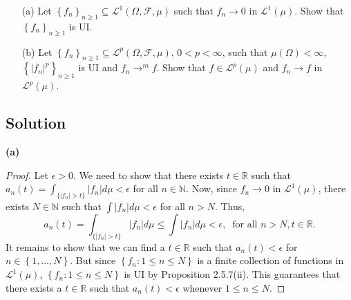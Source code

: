 \documentclass[12pt]{article}
\begin{document}
\begin{itemize}[label={}, leftmargin=7mm]
\item[(a)] Let $\left\{ f_{n} \right\}_{n\geq 1} \subseteq \mathcal{L}^{1}\left( \Omega, \mathcal{F}, \mu \right)$ such that $f_{n} \rightarrow 0$ in
$\mathcal{L}^{1}(\mu)$. Show that $\left\{ f_{n} \right\}_{n\geq 1}$ is UI.

\item[(b)] Let $\left\{ f_{n} \right\}_{n\geq 1} \subseteq \mathcal{L}^{p}\left( \Omega, \mathcal{F}, \mu \right)$, $0 < p < \infty$, such that
$\mu(\Omega) < \infty$, $\left\{ |f_{n}|^{p} \right\}_{n\geq 1}$ is UI and $f_{n} \rightarrow^{m} f$. Show that $f \in \mathcal{L}^{p}(\mu)$ and
$f_{n} \rightarrow f$ in $\mathcal{L}^{p}(\mu)$.
\end{itemize}

\subsection*{Solution}
{\bf (a)}
\begin{proof}
Let $\epsilon > 0$. We need to show that there exists $t \in \mathbb{R}$ such that $a_{n}(t) = \int_{\{|f_{n}|>t\}}|f_{n}|d\mu < \epsilon$ for all $n
\in \mathbb{N}$. Now, since $f_{n}\rightarrow 0$ in $\mathcal{L}^{1}(\mu)$, there exists $N \in \mathbb{N}$ such that $\int|f_n|d\mu < \epsilon$ for
all $n > N$. Thus,
\[ a_{n}(t) = \int_{\{|f_{n}| > t\}}|f_{n}|d\mu \leq \int|f_{n}|d\mu < \epsilon, \  \text{ for all }n > N, t\in\mathbb{R}. \]
It remains to show that we can find a $t\in\mathbb{R}$ such that $a_{n}(t) < \epsilon$ for $n \in \left\{ 1,\hdots, N \right\}$. But since $\left\{
f_{n} : 1\leq n \leq N \right\}$ is a finite collection of functions in $\mathcal{L}^{1}(\mu)$, $\left\{ f_{n} : 1\leq n \leq N \right\}$ is UI by
Proposition 2.5.7(ii). This guarantees that there exists a $t \in \mathbb{R}$ such that $a_{n}(t) < \epsilon$ whenever $1 \leq n \leq N$.
\end{proof}
\end{document}
